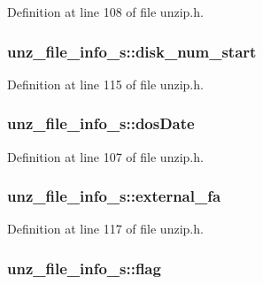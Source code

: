 Definition at line 108 of file unzip.\+h.

\hypertarget{structunz__file__info__s_ab7bfba2b7d0cdb7260a7cd9f9ccd00ff}{
\subsubsection[{disk\+\_\+num\+\_\+start}]{ unz\+\_\+file\+\_\+info\+\_\+s\+::disk\+\_\+num\+\_\+start}}\label{structunz__file__info__s_ab7bfba2b7d0cdb7260a7cd9f9ccd00ff}


Definition at line 115 of file unzip.\+h.

\hypertarget{structunz__file__info__s_a14bd7da84cada0f4b1455d60274eef91}{
\subsubsection[{dos\+Date}]{ unz\+\_\+file\+\_\+info\+\_\+s\+::dos\+Date}}\label{structunz__file__info__s_a14bd7da84cada0f4b1455d60274eef91}


Definition at line 107 of file unzip.\+h.

\hypertarget{structunz__file__info__s_ae3365fdb260668fca60bfb975b1513aa}{
\subsubsection[{external\+\_\+fa}]{ unz\+\_\+file\+\_\+info\+\_\+s\+::external\+\_\+fa}}\label{structunz__file__info__s_ae3365fdb260668fca60bfb975b1513aa}


Definition at line 117 of file unzip.\+h.

\hypertarget{structunz__file__info__s_adff7171a3114d55e5532c593b1779ecc}{
\subsubsection[{flag}]{ unz\+\_\+file\+\_\+info\+\_\+s\+::flag}}\label{structunz__file__info__s_adff7171a3114d55e5532c593b1779ecc}


